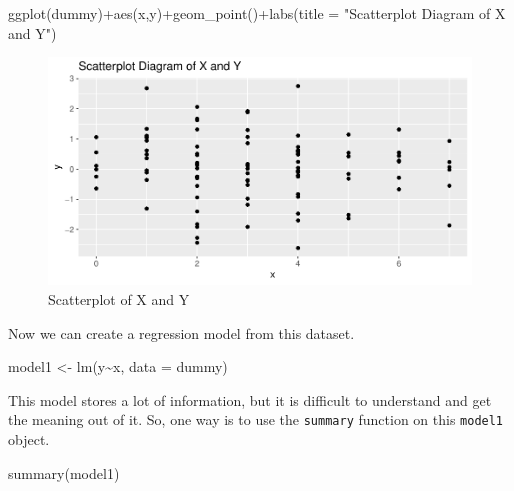 \documentclass[
  letterpaper,
  paper =a4,
  twoside,
  openright,
  headsepline,
  footsepline,
  listof = totocnumbered,
  chapterprefix = true,
  firstiscover]{scrbook}
\newenvironment{Shaded}{\begin{snugshade}}{\end{snugshade}}
\newcommand{\AttributeTok}[1]{\textcolor[rgb]{0.40,0.45,0.13}{#1}}
\newcommand{\FunctionTok}[1]{\textcolor[rgb]{0.28,0.35,0.67}{#1}}
\newcommand{\NormalTok}[1]{\textcolor[rgb]{0.00,0.23,0.31}{#1}}
\newcommand{\OtherTok}[1]{\textcolor[rgb]{0.00,0.23,0.31}{#1}}
\newcommand{\SpecialCharTok}[1]{\textcolor[rgb]{0.37,0.37,0.37}{#1}}
\newcommand{\StringTok}[1]{\textcolor[rgb]{0.13,0.47,0.30}{#1}}
\begin{document}
\begin{Shaded}
\begin{Highlighting}[numbers=left,,]
\FunctionTok{ggplot}\NormalTok{(dummy)}\SpecialCharTok{+}\FunctionTok{aes}\NormalTok{(x,y)}\SpecialCharTok{+}\FunctionTok{geom\_point}\NormalTok{()}\SpecialCharTok{+}\FunctionTok{labs}\NormalTok{(}\AttributeTok{title =} \StringTok{"Scatterplot Diagram of X and Y"}\NormalTok{)}
\end{Highlighting}
\end{Shaded}

\begin{figure}[H]

{\centering \includegraphics{lm_files/figure-pdf/fig-scatterplot-1.pdf}

}

\caption{\label{fig-scatterplot}Scatterplot of X and Y}

\end{figure}

Now we can create a regression model from this dataset.

\begin{Shaded}
\begin{Highlighting}[numbers=left,,]
\NormalTok{model1 }\OtherTok{\textless{}{-}} \FunctionTok{lm}\NormalTok{(y}\SpecialCharTok{\textasciitilde{}}\NormalTok{x, }\AttributeTok{data =}\NormalTok{ dummy)}
\end{Highlighting}
\end{Shaded}

This model stores a lot of information, but it is difficult to
understand and get the meaning out of it. So, one way is to use the
\texttt{summary} function on this \texttt{model1} object.

\begin{Shaded}
\begin{Highlighting}[numbers=left,,]
\FunctionTok{summary}\NormalTok{(model1)}
\end{Highlighting}
\end{Shaded}
\end{document}
